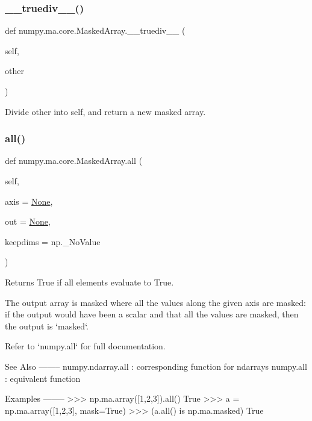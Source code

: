 \subsubsection{\texorpdfstring{\+\_\+\+\_\+truediv\+\_\+\+\_\+()}{\_\_truediv\_\_()}}
{\footnotesize\ttfamily def numpy.\+ma.\+core.\+Masked\+Array.\+\_\+\+\_\+truediv\+\_\+\+\_\+ (\begin{DoxyParamCaption}\item[{}]{self,  }\item[{}]{other }\end{DoxyParamCaption})}

\begin{DoxyVerb}Divide other into self, and return a new masked array.\end{DoxyVerb}
 \mbox{\label{classnumpy_1_1ma_1_1core_1_1MaskedArray_a9686c7668cd38db0a2a75d11897a1b7f}} 
\subsubsection{\texorpdfstring{all()}{all()}}
{\footnotesize\ttfamily def numpy.\+ma.\+core.\+Masked\+Array.\+all (\begin{DoxyParamCaption}\item[{}]{self,  }\item[{}]{axis = {\ttfamily \hyperlink{namespacenumpy_1_1ma_1_1core_a647ee1848dfa3692fe35a663a2aa40b3}{None}},  }\item[{}]{out = {\ttfamily \hyperlink{namespacenumpy_1_1ma_1_1core_a647ee1848dfa3692fe35a663a2aa40b3}{None}},  }\item[{}]{keepdims = {\ttfamily np.\+\_\+NoValue} }\end{DoxyParamCaption})}

\begin{DoxyVerb}Returns True if all elements evaluate to True.

The output array is masked where all the values along the given axis
are masked: if the output would have been a scalar and that all the
values are masked, then the output is `masked`.

Refer to `numpy.all` for full documentation.

See Also
--------
numpy.ndarray.all : corresponding function for ndarrays
numpy.all : equivalent function

Examples
--------
>>> np.ma.array([1,2,3]).all()
True
>>> a = np.ma.array([1,2,3], mask=True)
>>> (a.all() is np.ma.masked)
True\end{DoxyVerb}
 \mbox{\label{classnumpy_1_1ma_1_1core_1_1MaskedArray_a0d24586f5133b41fb8c0af260826330c}} 
